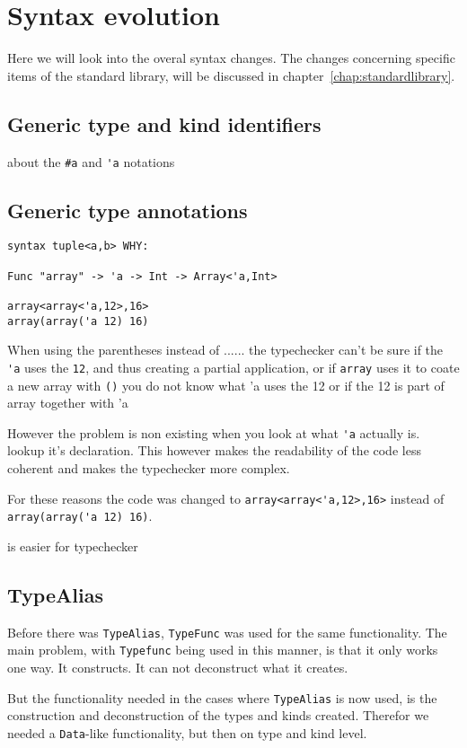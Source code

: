 \chapter{Syntax evolution}
Here we will look into the overal syntax changes.
The changes concerning specific items of the standard library, will be discussed in chapter~\ref{chap:standardlibrary}.

\section{Generic type and kind identifiers}
about the \verb|#a| and \verb|'a| notations

\section{Generic type annotations}
\begin{lstlisting}
syntax tuple<a,b> WHY:

Func "array" -> 'a -> Int -> Array<'a,Int>

array<array<'a,12>,16>
array(array('a 12) 16)
\end{lstlisting}

When using the parentheses instead of ...... the typechecker can't be sure if the \verb|'a| uses the \verb|12|, and thus creating a partial application, or if \verb|array| uses it to coate a new array
with \verb|()| you do not know what 'a uses the 12 or if the 12 is part of array together with 'a

However the problem is non existing when you look at what \verb|'a| actually is. lookup it's declaration.
This however makes the readability of the code less coherent and makes the typechecker more complex.

For these reasons the code was changed to \verb|array<array<'a,12>,16>| instead of \verb|array(array('a 12) 16)|.

is easier for typechecker

\section{TypeAlias}
Before there was \verb|TypeAlias|, \verb|TypeFunc| was used for the same functionality.
The main problem, with \verb|Typefunc| being used in this manner, is that it only works one way.
It constructs.
It can not deconstruct what it creates.

But the functionality needed in the cases where \verb|TypeAlias| is now used, is the construction and deconstruction of the types and kinds created.
Therefor we needed a \verb|Data|-like functionality, but then on type and kind level.

